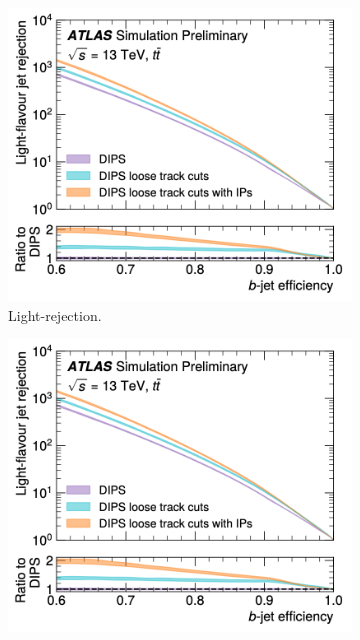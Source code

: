 \begin{figure}[h!]
  \centering
  \begin{subfigure}[b]{0.48\textwidth}
      \centering
      \includegraphics[width=\textwidth]{Images/FTAG/dipsOptL.png}
      \caption{Light-rejection.} 
      \label{fig:dipsOptRocL}
  \end{subfigure}
  \hfill
  \begin{subfigure}[b]{0.48\textwidth}
      \centering
      \includegraphics[width=\textwidth]{Images/FTAG/dipsOptL.png}

\end{subfigure}
\end{figure}
